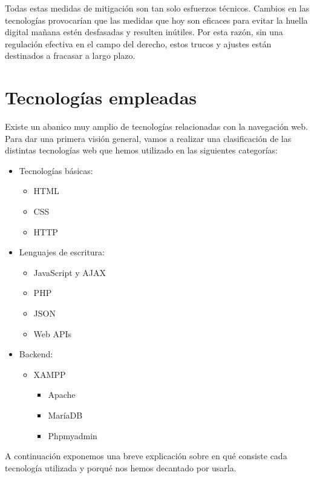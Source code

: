 Todas estas medidas de mitigación son tan solo esfuerzos técnicos. Cambios en las tecnologías provocarían que las medidas que hoy son eficaces para evitar la huella digital mañana estén desfasadas y resulten inútiles. Por esta razón, sin una regulación efectiva en el campo del derecho, estos trucos y ajustes están destinados a fracasar a largo plazo.  \par 

\section{Tecnologías empleadas}

Existe un abanico muy amplio de tecnologías\cite{web_mozilla} relacionadas con la navegación web. Para dar una primera visión general, vamos a realizar una clasificación de las distintas tecnologías web que hemos utilizado en las siguientes categorías: \par
\begin{itemize}
	\item Tecnologías básicas:
		\begin{itemize}
			\item HTML
			\item CSS
			\item HTTP
		\end{itemize}
	\item Lenguajes de escritura:
		\begin{itemize}
			\item JavaScript y AJAX
			\item PHP
			\item JSON
			\item Web APIs
		\end{itemize}
	\item Backend:
		\begin{itemize}
			\item XAMPP
				\begin{itemize}
					\item Apache
					\item MaríaDB
					\item Phpmyadmin
				\end{itemize}
		\end{itemize}
\end{itemize}

A continuación exponemos una breve explicación sobre en qué consiste cada tecnología utilizada y porqué nos hemos decantado por usarla. \par 

